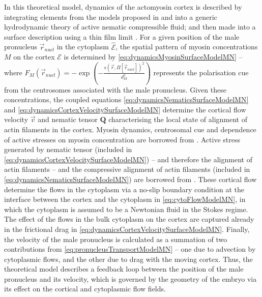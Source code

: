 In this theoretical model, dynamics of the actomyosin cortex is described by integrating elements from the models proposed in \cite{gross2019guiding} and \cite{reymann2016cortical} into a generic hydrodynamic theory of active nematic compressible fluid; and then made into a surface description using a thin film limit \citep{nitschke2018nematic}. For a given position of the male pronucleus $\vec{r}_{nucl}$ in the cytoplasm $\hat{\mathcal{E}}$, the spatial pattern of myosin concentrations $M$ on the cortex $\mathcal{E}$ is determined by \autoref{eq:dynamicsMyosinSurfaceModelMN} -- where $F_M(\vec{r}_{nucl}) = -\exp(-\frac{s(\vec{r},\Pi[\vec{r}_{nucl}])^2}{d_M^2})$ represents the polarisation cue from the centrosomes associated with the male pronucleus. Given these concentrations, the coupled equations \autoref{eq:dynamicsNematicsSurfaceModelMN} and \autoref{eq:dynamicsCortexVelocitySurfaceModelMN} determine the cortical flow velocity $\vec{v}$ and nematic tensor $\mathbf{Q}$ characterising the local state of alignment of actin filaments in the cortex. Myosin dynamics, centrosomal cue and dependence of active stresses on myosin concentration are borrowed from \cite{gross2019guiding}. Active stress generated by nematic tensor (included in \autoref{eq:dynamicsCortexVelocitySurfaceModelMN}) -- and therefore the alignment of actin filaments -- and the compressive alignment of actin filaments (included in \autoref{eq:dynamicsNematicsSurfaceModelMN}) are borrowed from \cite{reymann2016cortical}. These cortical flow determine the flows in the cytoplasm via a no-slip boundary condition at the interface between the cortex and the cytoplasm in \autoref{eq:cytoFlowModelMN}, in which the cytoplasm is assumed to be a Newtonian fluid in the Stokes regime. The effect of the flows in the bulk cytoplasm on the cortex are captured already in the frictional drag in \autoref{eq:dynamicsCortexVelocitySurfaceModelMN}. Finally, the velocity of the male pronucleus is calculated as a summation of two contributions from \autoref{eq:pronucleusTransportModelMN} -- one due to advection by cytoplasmic flows, and the other due to drag with the moving cortex. Thus, the theoretical model describes a feedback loop between the position of the male pronucleus and its velocity, which is governed by the geometry of the embryo via its effect on the cortical and cytoplasmic flow fields.

